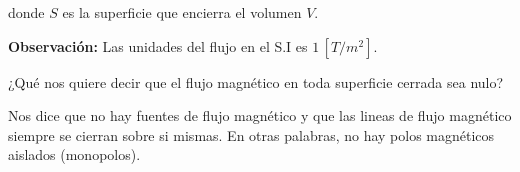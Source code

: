 donde $S$ es la superficie que encierra el volumen $V$.

\textbf{Observación:} Las unidades del flujo en el S.I es $1 \,
[T/m^2]$.

¿Qué nos quiere decir que el flujo magnético en toda superficie cerrada sea nulo? 

Nos dice que no hay fuentes de flujo magnético y que las lineas de flujo magnético siempre se cierran sobre si mismas. En otras palabras, no hay polos magnéticos aislados (monopolos).


